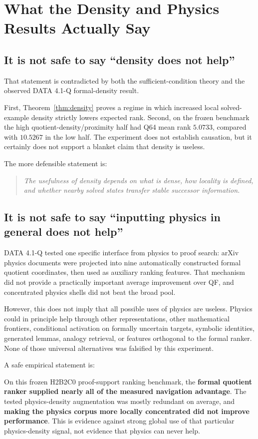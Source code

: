 \documentclass[11pt]{article}
\begin{document}
\section{What the Density and Physics Results Actually Say}

\subsection{It is not safe to say ``density does not help''}

That statement is contradicted by both the sufficient-condition theory and the observed DATA 4.1-Q formal-density result.

First, Theorem~\ref{thm:density} proves a regime in which increased local solved-example density strictly lowers expected rank. Second, on the frozen benchmark the high quotient-density/proximity half had Q64 mean rank $5.0733$, compared with $10.5267$ in the low half. The experiment does not establish causation, but it certainly does not support a blanket claim that density is useless.

The more defensible statement is:
\begin{quote}
\emph{The usefulness of density depends on what is dense, how locality is defined, and whether nearby solved states transfer stable successor information.}
\end{quote}

\subsection{It is not safe to say ``inputting physics in general does not help''}

DATA 4.1-Q tested one specific interface from physics to proof search: arXiv physics documents were projected into nine automatically constructed formal quotient coordinates, then used as auxiliary ranking features. That mechanism did not provide a practically important average improvement over QF, and concentrated physics shells did not beat the broad pool.

However, this does not imply that all possible uses of physics are useless. Physics could in principle help through other representations, other mathematical frontiers, conditional activation on formally uncertain targets, symbolic identities, generated lemmas, analogy retrieval, or features orthogonal to the formal ranker. None of those universal alternatives was falsified by this experiment.

A safe empirical statement is:
\begin{tcolorbox}[colback=softtwo,colframe=accenttwo,title=Evidence-supported interpretation]
On this frozen H2B2C0 proof-support ranking benchmark, the \textbf{formal quotient ranker supplied nearly all of the measured navigation advantage}. The tested physics-density augmentation was mostly redundant on average, and \textbf{making the physics corpus more locally concentrated did not improve performance}. This is evidence against strong global use of that particular physics-density signal, not evidence that physics can never help.
\end{tcolorbox}
\end{document}
